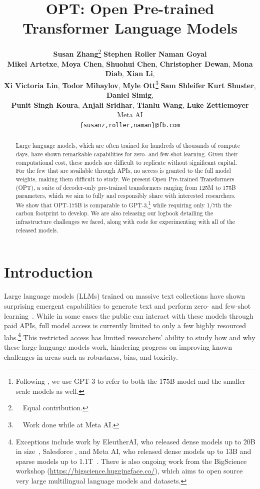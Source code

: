 \documentclass[11pt]{article}
\title{OPT: Open Pre-trained Transformer Language Models}
\author{
{\bf Susan Zhang}\thanks{\ \ Equal contribution.
}\footnotemark[1]{\normalfont ,} 
{\bf Stephen Roller}\footnotemark[1]{\normalfont ,} 
{\bf Naman Goyal}\footnotemark[1]{\normalfont ,} 
\\
{\bf Mikel Artetxe}{\normalfont ,}
{\bf Moya Chen}{\normalfont ,}
{\bf Shuohui Chen}{\normalfont ,}
{\bf Christopher Dewan}{\normalfont ,}
{\bf Mona Diab}{\normalfont ,}
{\bf Xian Li}{\normalfont ,} \\
{\bf Xi Victoria Lin}{\normalfont ,}
{\bf Todor Mihaylov}{\normalfont ,}
{\bf Myle Ott}\thanks{\ \ Work done while at Meta AI.}\footnotemark[2]{\normalfont ,}
{\bf Sam Shleifer}\footnotemark[2]{\normalfont ,} 
{\bf Kurt Shuster}{\normalfont ,} 
{\bf Daniel Simig}{\normalfont ,} \\
{\bf Punit Singh Koura}{\normalfont ,}
{\bf Anjali Sridhar}{\normalfont ,}
{\bf Tianlu Wang}{\normalfont ,}
{\bf Luke Zettlemoyer}{\normalfont } \\
\tablewhitespace
Meta AI\\
\tablewhitespace
\texttt{\{susanz,roller,naman\}@fb.com}
}
\newcommand{\OPT}[0]{{OPT-175B}}
\newcommand{\biggpt}[1]{{GPT-3#1}}
\begin{document}
\maketitle
\begin{abstract}
Large language models, which are often trained for hundreds of thousands of compute days, have shown remarkable capabilities for zero- and few-shot learning. Given their computational cost, these models are difficult to replicate without significant capital.  For the few that are available through APIs, no access is granted to the full model weights, making them difficult to study. We present Open Pre-trained Transformers (OPT), a suite of decoder-only pre-trained transformers ranging from 125M to 175B parameters, which we aim to fully and responsibly share with interested researchers. We show that \OPT{} is comparable to \biggpt{},\footnote{Following \citet{brown2020gpt3}, we use \biggpt{} to  refer to both the 175B model and the smaller scale models as well.} while requiring only 1/7th the carbon footprint to develop.  We are also releasing our logbook detailing the infrastructure challenges we faced, along with code for experimenting with all of the released models.
\end{abstract}

\section{Introduction}

Large language models (LLMs) trained on massive text collections have shown surprising emergent capabilities to generate text and perform zero- and few-shot learning~\cite{brown2020gpt3,J1WhitePaper,megatron2022,gopher2022,palm2022}. While in some cases the public can interact with these models through paid APIs, full model access is currently limited to only a few highly resourced labs.\footnote{Exceptions include work by EleutherAI, who released dense models up to 20B in size~\cite{eleutherai2022}, Salesforce \cite{Nijkamp2022ACP}, and Meta AI, who released dense models up to 13B and sparse models up to 1.1T~\cite{1TMoE2021}. There is also ongoing work from the BigScience workshop (\url{https://bigscience.huggingface.co/}), which aims to open source very large multilingual language models and datasets.} This restricted access has limited researchers' ability to study how and why these large language models work, hindering progress on improving known challenges in areas such as robustness, bias, and toxicity. 
\end{document}
